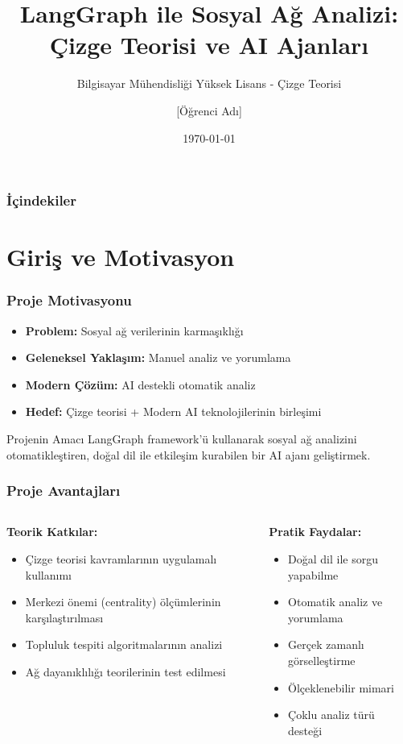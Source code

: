 \documentclass[aspectratio=169]{beamer}
\title{LangGraph ile Sosyal Ağ Analizi: \\ Çizge Teorisi ve AI Ajanları}
\subtitle{Bilgisayar Mühendisliği Yüksek Lisans - Çizge Teorisi}
\author{[Öğrenci Adı]}
\institute{[Üniversite Adı]}
\date{\today}
\begin{document}
\frame{\titlepage}

\begin{frame}
\frametitle{İçindekiler}
\tableofcontents
\end{frame}

\section{Giriş ve Motivasyon}

\begin{frame}
\frametitle{Proje Motivasyonu}
\begin{itemize}
    \item \textbf{Problem:} Sosyal ağ verilerinin karmaşıklığı
    \item \textbf{Geleneksel Yaklaşım:} Manuel analiz ve yorumlama
    \item \textbf{Modern Çözüm:} AI destekli otomatik analiz
    \item \textbf{Hedef:} Çizge teorisi + Modern AI teknolojilerinin birleşimi
\end{itemize}

\vspace{0.5cm}
\begin{block}{Projenin Amacı}
LangGraph framework'ü kullanarak sosyal ağ analizini otomatikleştiren, doğal dil ile etkileşim kurabilen bir AI ajanı geliştirmek.
\end{block}
\end{frame}

\begin{frame}
\frametitle{Proje Avantajları}
\begin{columns}
\begin{column}{0.5\textwidth}
\textbf{Teorik Katkılar:}
\begin{itemize}
    \item Çizge teorisi kavramlarının uygulamalı kullanımı
    \item Merkezi önemi (centrality) ölçümlerinin karşılaştırılması
    \item Topluluk tespiti algoritmalarının analizi
    \item Ağ dayanıklılığı teorilerinin test edilmesi
\end{itemize}
\end{column}
\begin{column}{0.5\textwidth}
\textbf{Pratik Faydalar:}
\begin{itemize}
    \item Doğal dil ile sorgu yapabilme
    \item Otomatik analiz ve yorumlama
    \item Gerçek zamanlı görselleştirme
    \item Ölçeklenebilir mimari
    \item Çoklu analiz türü desteği
\end{itemize}
\end{column}
\end{columns}
\end{frame}
\end{document}
